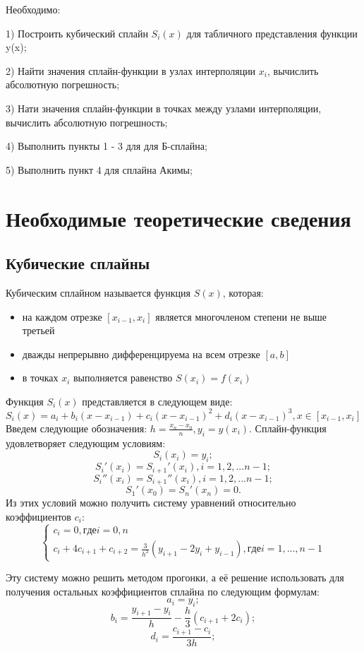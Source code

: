 \documentclass[12pt]{article}
\begin{document}
	Необходимо:
	
		1) Построить кубический сплайн $S_i(x)$ для табличного представления функции y(x);
		
		2) Найти значения сплайн-функции в узлах интерполяции $x_i$, вычислить абсолютную погрешность;
		
		3) Нати значения сплайн-функции в точках между узлами интерполяции, вычислить абсолютную погрешность;
		
		4) Выполнить пункты 1 - 3 для для Б-сплайна;
		
		5) Выполнить пункт 4 для сплайна Акимы;
    
    	\clearpage
    
    	{
        	\section{Необходимые теоретические сведения}
   	}
    
    	{
    		\subsection{Кубические сплайны}
    	}
	
	Кубическим сплайном называется функция $S(x)$, которая:
	\begin{itemize}
		\item на каждом отрезке $[x_{i-1}, x_i]$ является многочленом степени не выше третьей
		\item дважды непрерывно дифференцируема на всем отрезке $[a, b]$
		\item в точках $x_i$ выполняется равенство $S(x_i)=f(x_i)$
	\end{itemize}
	
	Функция $S_i(x)$ представляется в следующем виде:
		$$ S_i(x) = a_i + b_i(x-x_{i-1})+c_i(x-x_{i-1})^2+d_i(x-x_{i-1})^3, x \in [x_{i-1}, x_i]$$
	Введем следующие обозначения: $h=\frac{x_n-x_0}{n}, y_i=y(x_i)$. Сплайн-функция удовлетворяет следующим условиям:
		$$S_i(x_i)=y_i;$$
		$$S_i'(x_i)=S_{i+1}'(x_i), i=1,2,...n-1;$$
		$$S_i''(x_i)=S_{i+1}''(x_i), i=1,2,...n-1;$$
		$$S_1'(x_0)=S_n'(x_n)=0.$$
	Из этих условий можно получить систему уравнений относительно коэффициентов $c_i$:
	$$
 \begin{cases}
   c_i=0, где i=0,n\\
   c_i + 4c_{i+1}+c_{i+2}=\frac{3}{h^2}(y_{i+1}-2y_i+y_{i-1}), где i=1,...,n-1
 \end{cases}$$
 
	Эту систему можно решить методом прогонки, а её решение использовать для получения остальных коэффициентов сплайна по следующим формулам:
		$$a_i = y_i;$$
		$$b_i=\frac{y_{i+1}-y_i}{h}-\frac{h}{3}(c_{i+1}+2c_i);$$
		$$d_i=\frac{c_{i+1}-c_i}{3h};$$
		
\end{document}
